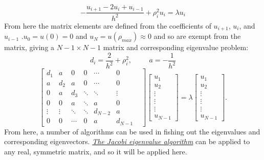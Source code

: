 \documentclass[10pt,a4paper]{article}
\begin{document}
\begin{equation*}
-\frac{u_{i+1} -2u_i +u_{i-1}}{h^2}+\rho_i^2u_i= \lambda u_i
\end{equation*}
From here the matrix elements are defined from the coefficients of $u_{i+1}$, $u_{i}$, and $u_{i-1}$ .$u_0 = u(0)= 0$ and $u_N = u(\rho_{max}) \approx 0$ and so are exempt from the matrix, giving a $N-1 \times N-1$ matrix and corresponding eigenvalue problem:
$$
d_i=\frac{2}{h^2}+\rho_i^2,\hspace{1cm}  a=-\frac{1}{h^2}
$$
\begin{equation*}
\begin{bmatrix}
d_1 & a &0  &0  &\cdots  & 0\\ 
 a&  d_2& a & 0 & \cdots &0 \\ 
 0&  a&  d_3& \ddots  &\ddots  &\vdots \\ 
 0& 0 & a &  \ddots& a &0 \\ 
 \vdots&\vdots  &\ddots  &\ddots  &  d_{N-2}&a \\ 
 0& 0 & \cdots & 0 & a &d_{N-1}& 
\end{bmatrix}
  \begin{bmatrix} u_{1} \\
                                                              u_{2} \\
                                                              \vdots\\ \vdots\\ \vdots\\
                                                              u_{N-1}
             \end{bmatrix}=\lambda \begin{bmatrix} u_{1} \\
                                                              u_{2} \\
                                                              \vdots\\ \vdots\\ \vdots\\
                                                              u_{N-1}
             \end{bmatrix}.  
      \label{eq:sematrix}
\end{equation*}
From here, a number of algorithms can be used in fishing out the eigenvalues and corresponding eigenvectors. \hyperref[jacobi algo]{\emph{The Jacobi eigenvalue algorithm}} can be applied to any real, symmetric matrix, and so it will be applied here.
\end{document}
